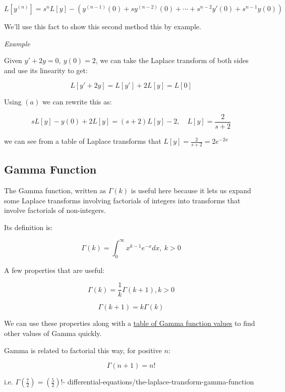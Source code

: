 \documentclass{article}
\begin{document}
\[ \tag{a} L[y^{(n)}] = s^n L[y] - (y^{(n-1)}(0) + sy^{(n-2)}(0) + \cdots + s^{n-2}y'(0) + s^{n-1} y(0)) \]

We'll use this fact to show this second method this by example.

\emph{Example}

Given $y' + 2y = 0, ~y(0) = 2$, we can take the Laplace transform of both sides and use its linearity to get:

\[ \tag{b} L[y' + 2y] = L[y'] + 2L[y] = L[0] \]

Using $(a)$ we can rewrite this as:

\[ \tag{c} sL[y] - y(0) + 2L[y] = (s+2)L[y] - 2, \quad L[y] = \frac{2}{s+2} \]

we can see from a table of Laplace transforms that $L[y] = \frac{2}{s+2} = 2e^{-2x}$

\subsection{Gamma Function}

The Gamma function, written as $\Gamma (k)$ is useful here because it lets us expand some Laplace transforms involving factorials of integers into transforms that involve factorials of non-integers.

Its definition is:

\[ \Gamma (k) = \int_0^{\infty} x^{k-1} e^{-x} dx,~k > 0 \]

A few properties that are useful:

\[ \Gamma (k) = \frac{1}{k}\Gamma(k + 1), k > 0 \]

\[ \Gamma(k + 1) = k \Gamma(k) \]

We can use these properties along with a \href{https://en.wikipedia.org/wiki/Particular_values_of_the_gamma_function}{table of Gamma function values} to find other values of Gamma quickly.

Gamma is related to factorial this way, for positive $n$:

\[ \Gamma(n + 1) = n! \]

i.e. $\Gamma(\frac{7}{2}) = (\frac{5}{2})! $- differential-equations/the-laplace-transform-gamma-function
\end{document}
